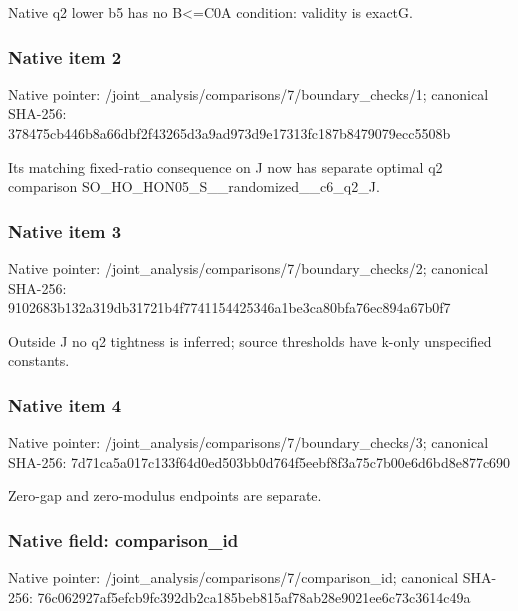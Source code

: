 \documentclass[10pt,a4paper]{article}
\begin{document}
\begingroup\raggedright\sloppy Native q2 lower b5 has no B<=\allowbreak{}C0A condition:\allowbreak{} validity is exactG.\par\endgroup

\subsubsection{Native item 2}
Native pointer: /joint\_\allowbreak{}analysis/comparisons/7/boundary\_\allowbreak{}checks/1; canonical SHA-256: 378475cb446b8a66dbf2f43265d3a9ad973d9e17313fc187b8479079ecc5508b

\begingroup\raggedright\sloppy Its matching fixed-ratio consequence on J now has separate optimal q2 comparison SO\_\allowbreak{}HO\_\allowbreak{}HON05\_\allowbreak{}S\_\allowbreak{}\_\allowbreak{}randomized\_\allowbreak{}\_\allowbreak{}c6\_\allowbreak{}q2\_\allowbreak{}J.\par\endgroup

\subsubsection{Native item 3}
Native pointer: /joint\_\allowbreak{}analysis/comparisons/7/boundary\_\allowbreak{}checks/2; canonical SHA-256: 9102683b132a319db31721b4f7741154425346a1be3ca80bfa76ec894a67b0f7

\begingroup\raggedright\sloppy Outside J no q2 tightness is inferred;\allowbreak{} source thresholds have k-only unspecified constants.\par\endgroup

\subsubsection{Native item 4}
Native pointer: /joint\_\allowbreak{}analysis/comparisons/7/boundary\_\allowbreak{}checks/3; canonical SHA-256: 7d71ca5a017c133f64d0ed503bb0d764f5eebf8f3a75c7b00e6d6bd8e877c690

\begingroup\raggedright\sloppy Zero-gap and zero-modulus endpoints are separate.\par\endgroup

\subsubsection{Native field: comparison\_\allowbreak{}id}
Native pointer: /joint\_\allowbreak{}analysis/comparisons/7/comparison\_\allowbreak{}id; canonical SHA-256: 76c062927af5efcb9fc392db2ca185beb815af78ab28e9021ee6c73c3614c49a
\end{document}
